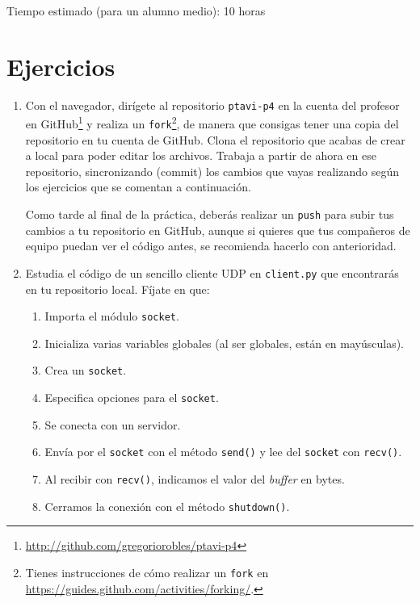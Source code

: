 \documentclass[11pt,a4paper]{article}
\begin{document}
Tiempo estimado (para un alumno medio): 10 horas

\section{Ejercicios}

\begin{enumerate}

  \item Con el navegador, dirígete al repositorio \texttt{ptavi-p4} en la cuenta del profesor en GitHub\footnote{\url{http://github.com/gregoriorobles/ptavi-p4}} y realiza un \texttt{fork}\footnote{Tienes instrucciones de cómo realizar un \texttt{fork} en \url{https://guides.github.com/activities/forking/}.}, de manera que consigas tener una copia del repositorio en tu cuenta de GitHub. Clona el repositorio que acabas de crear a local para poder editar los archivos. Trabaja a partir de ahora en ese repositorio, sincronizando (commit) los cambios que vayas realizando según los ejercicios que se comentan a continuación.

  Como tarde al final de la práctica, deberás realizar un \texttt{push} para subir tus cambios a tu repositorio en GitHub, aunque si quieres que tus compañeros de equipo puedan ver el código antes, se recomienda hacerlo con anterioridad.

  \item Estudia el código de un sencillo cliente UDP en \texttt{client.py} que encontrarás en tu repositorio local. Fíjate en que:
  \begin{enumerate}
    \item Importa el módulo \texttt{socket}.
    \item Inicializa varias variables globales (al ser globales, están en mayúsculas).
    \item Crea un \texttt{socket}.
    \item Especifica opciones para el \texttt{socket}.
    \item Se conecta con un servidor.
    \item Envía por el \texttt{socket} con el método \texttt{send()} y lee del \texttt{socket} con \texttt{recv()}.
    \item Al recibir con \texttt{recv()}, indicamos el valor del \emph{buffer} en bytes.
    \item Cerramos la conexión con el método \texttt{shutdown()}.
  \end{enumerate}



\end{enumerate}
\end{document}
